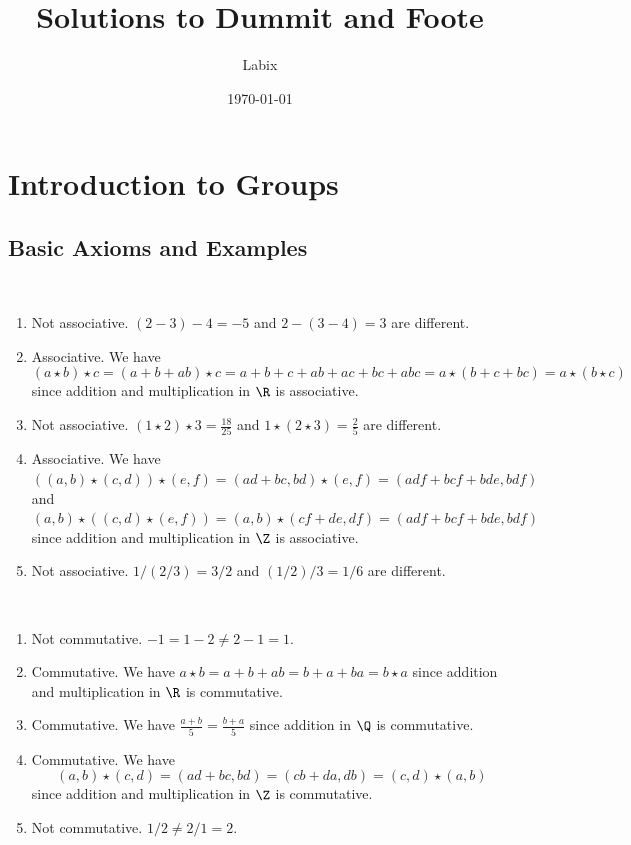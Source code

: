 \documentclass[a4paper]{article}
\title{Solutions to Dummit and Foote}
\author{Labix}
\date{\today}
\begin{document}
\maketitle
\pagebreak
\tableofcontents

\pagebreak
\section{Introduction to Groups}
\subsection{Basic Axioms and Examples}
\begin{ex}{}{}\\
\begin{enumerate}[label=(\alph*)]
\item Not associative. $(2-3)-4=-5$ and $2-(3-4)=3$ are different. 
\item Associative. We have $$(a\star b)\star c=(a+b+ab)\star c=a+b+c+ab+ac+bc+abc=a\star(b+c+bc)=a\star(b\star c)$$ since addition and multiplication in $\R$ is associative. 
\item Not associative. $(1\star 2)\star 3=\frac{18}{25}$ and $1\star(2\star 3)=\frac{2}{5}$ are different. 
\item Associative. We have $((a,b)\star(c,d))\star(e,f)=(ad+bc,bd)\star(e,f)=(adf+bcf+bde,bdf)$ and $(a,b)\star((c,d)\star(e,f))=(a,b)\star(cf+de,df)=(adf+bcf+bde,bdf)$ since addition and multiplication in $\Z$ is associative. 
\item Not associative. $1/(2/3)=3/2$ and $(1/2)/3=1/6$ are different. 
\end{enumerate}
\end{ex}

\begin{ex}{}{}\\
\begin{enumerate}[label=(\alph*)]
\item Not commutative. $-1=1-2\neq 2-1=1$. 
\item Commutative. We have $a\star b=a+b+ab=b+a+ba=b\star a$ since addition and multiplication in $\R$ is commutative. 
\item Commutative. We have $\frac{a+b}{5}=\frac{b+a}{5}$ since addition in $\Q$ is commutative. 
\item Commutative. We have $$(a,b)\star(c,d)=(ad+bc,bd)=(cb+da,db)=(c,d)\star(a,b)$$ since addition and multiplication in $\Z$ is commutative. 
\item Not commutative. $1/2\neq 2/1=2$. 
\end{enumerate}
\end{ex}
\end{document}
